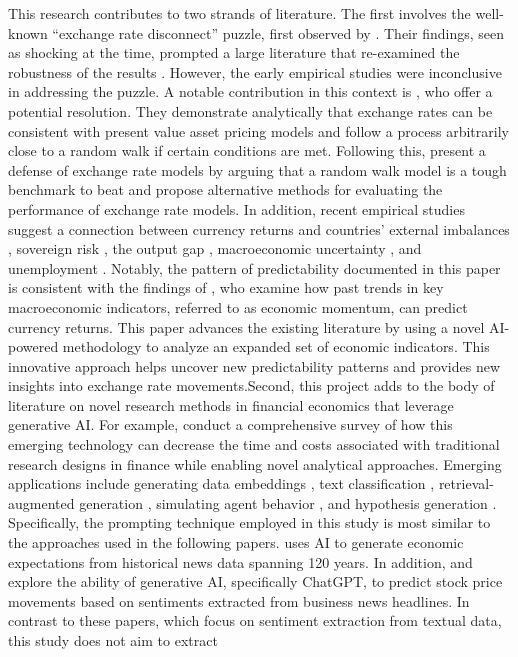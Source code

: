 \documentclass[12pt,oneside,letter]{article}
\begin{document}
	This research contributes to two strands of literature. The first involves the well-known “exchange rate disconnect” puzzle, first observed by \citet{Meese/Rogoff:1983}. Their findings, seen as shocking at the time, prompted a large literature that re-examined the robustness of the results \citep{MARK:1995, KILIAN:1999, CHEUNG/ETAL:2005, MOLODTSOVA/PAPELL:2009}. However, the early empirical studies were inconclusive in addressing the puzzle. A notable contribution in this context is \citet{ENGEL/WEST:2005}, who offer a potential resolution. They demonstrate analytically that exchange rates can be consistent with present value asset pricing models and follow a process arbitrarily close to a random walk if certain conditions are met. Following this, \citet{ENGEL/ETAL:2007} present a defense of exchange rate models by arguing that a random walk model is a tough benchmark to beat and propose alternative methods for evaluating the performance of exchange rate models. In addition, recent empirical studies suggest a connection between currency returns and countries’ external imbalances \citep{GOURINCHAS/REY:2007, DELLACORTE/ETAL:2012, DELLACORTE/ETAL:2016}, sovereign risk \citep{AUGUSTIN/ETAL:2020, DELLACORTE/ETAL:2022, DELLACORTE/ETAL:2023}, the output gap \citep{COLACITO/ETAL:2020}, macroeconomic uncertainty \citep{BERG/MARK:2018, DELLA/KRECETOVS:2024}, and unemployment \citep{NUCERA:2017}. Notably, the pattern of predictability documented in this paper is consistent with the findings of \citet{DAHLQUIST/HASSELTOFT:2020}, who examine how past trends in key macroeconomic indicators, referred to as economic momentum, can predict currency returns. This paper advances the existing literature by using a novel AI-powered methodology to analyze an expanded set of economic indicators. This innovative approach helps uncover new predictability patterns and provides new insights into exchange rate movements.\newline Second, this project adds to the body of literature on novel research methods in financial economics that leverage generative AI. For example, \citet{EISFELDT/SCHUBERT:2024} conduct a comprehensive survey of how this emerging technology can decrease the time and costs associated with traditional research designs in finance while enabling novel analytical approaches. Emerging applications include generating data embeddings \citep{GABIAX/ETAL:2024, KIM:2024}, text classification \citep{CHANGAND/ETAL:2024, KROCKENBERGER/ETAL:2024}, retrieval-augmented generation \citep{BARTIK/ETAL:2024, CHEN/WANG:2024}, simulating agent behavior \citep{HORTON:2023, FEDYK/ETAL:2024, Hewitt:2024}, and hypothesis generation \citep{SIETAL:2024, LUDWIG/MULLAINATHAN:2024}. Specifically, the prompting technique employed in this study is most similar to the approaches used in the following papers. \citet{Bybee:2023} uses AI to generate economic expectations from historical news data spanning 120 years. In addition, \citet{LOPEZLIRA/TANG:2023} and \citet{CHEN/ETAL:2023} explore the ability of generative AI, specifically ChatGPT, to predict stock price movements based on sentiments extracted from business news headlines. In contrast to these papers, which focus on sentiment extraction from textual data, this study does not aim to extract 
\end{document}
